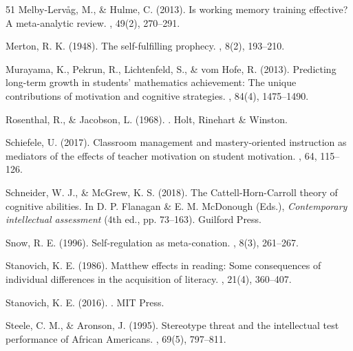 \documentclass[12pt,a4paper]{article}
\begin{document}
\begin{thebibliography}{51}
Melby-Lerv\aa{}g, M., \& Hulme, C. (2013).
\newblock Is working memory training effective? A meta-analytic review.
, 49(2), 270--291.

Merton, R. K. (1948).
\newblock The self-fulfilling prophecy.
, 8(2), 193--210.

Murayama, K., Pekrun, R., Lichtenfeld, S., \& vom Hofe, R. (2013).
\newblock Predicting long-term growth in students' mathematics achievement: The unique contributions of motivation and cognitive strategies.
, 84(4), 1475--1490.

Rosenthal, R., \& Jacobson, L. (1968).
.
\newblock Holt, Rinehart \& Winston.

Schiefele, U. (2017).
\newblock Classroom management and mastery-oriented instruction as mediators of the effects of teacher motivation on student motivation.
, 64, 115--126.

Schneider, W. J., \& McGrew, K. S. (2018).
\newblock The Cattell-Horn-Carroll theory of cognitive abilities.
\newblock In D. P. Flanagan \& E. M. McDonough (Eds.), {\em Contemporary intellectual assessment} (4th ed., pp. 73--163). Guilford Press.

Snow, R. E. (1996).
\newblock Self-regulation as meta-conation.
, 8(3), 261--267.

Stanovich, K. E. (1986).
\newblock Matthew effects in reading: Some consequences of individual differences in the acquisition of literacy.
, 21(4), 360--407.

Stanovich, K. E. (2016).
.
\newblock MIT Press.

Steele, C. M., \& Aronson, J. (1995).
\newblock Stereotype threat and the intellectual test performance of African Americans.
, 69(5), 797--811.


\end{thebibliography}
\end{document}
